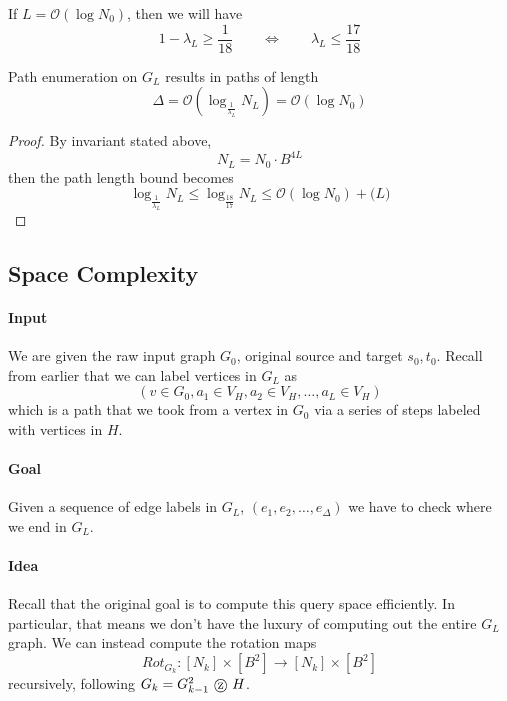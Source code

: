 \begin{proposition} 
If $L = \mathcal O (\log N_0 )$, then we will have 
\begin{equation}
	1 - \lambda_L \geq \frac{1}{18} \quad \quad \iff 
	\quad \quad \lambda_L \leq \frac{17}{18}
\end{equation}	
\end{proposition}

\begin{proposition}
	Path enumeration on $G_L$ results in paths of length 
	\begin{equation}
		\Delta = \mathcal O \left( \log _{\frac{1}{\lambda_L}} N_L \right) = \mathcal O \left( \log N_0 \right)
	\end{equation}
\end{proposition}
\begin{proof}
	By invariant stated above, 
	\begin{equation}
		N_L = N_0 \cdot B^{4L}
	\end{equation}
	then the path length bound becomes
	\begin{equation}
		\log _{\frac{1}{\lambda_L}} N_L \leq \log_{\frac{18}{17}} N_L \leq \mathcal O( \log N_0 ) + \mathcal (L )
	\end{equation}
\end{proof}


\subsection{Space Complexity}
\paragraph{Input} We are given the raw input graph $G_0$, original source and target $s_0, t_0$. Recall from earlier that we can label vertices in $G_L$ as
\begin{equation}
	(v\in G_0, a_1 \in V_H, a_2 \in V_H, \dots, a_L \in V_H)
\end{equation}
which is a path that we took from a vertex in $G_0$ via a series of steps labeled with vertices in $H$. 

\paragraph{Goal} Given a sequence of edge labels in $G_L$, 
$
	(e_1, e_2, \dots, e_\Delta)
$
we have to check where we end in $G_L$. 

\paragraph{Idea}
Recall that the original goal is to compute this query space efficiently. In particular, that means we don't have the luxury of computing out the entire $G_L$ graph. We can instead compute the rotation maps 
\begin{equation}
	Rot_{G_k}: [N_k] \times [B^2] \rightarrow [N_k] \times [B^2]
\end{equation}
recursively, following $G_k = G^2_{k - 1} \tcircle {z} H$. 

